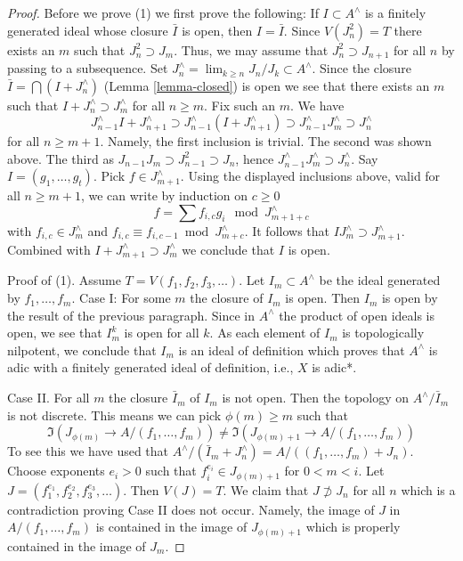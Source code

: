 \begin{proof}
\medskip\noindent
Before we prove (1) we first prove the following: If $I \subset A^\wedge$ is
a finitely generated ideal whose closure $\bar I$ is open, then $I = \bar I$.
Since $V(J_n^2) = T$ there exists an $m$ such that $J_n^2 \supset J_m$.
Thus, we may assume that $J_n^2 \supset J_{n + 1}$ for all $n$ by passing
to a subsequence. Set $J_n^\wedge = \lim_{k \geq n} J_n/J_k \subset A^\wedge$.
Since the closure $\bar I = \bigcap (I + J_n^\wedge)$
(Lemma \ref{lemma-closed}) is open we see that there exists an $m$ such that
$I + J_n^\wedge \supset J_m^\wedge$ for all $n \geq m$. Fix such an $m$.
We have
$$
J_{n - 1}^\wedge I + J_{n + 1}^\wedge \supset
J_{n - 1}^\wedge (I + J_{n + 1}^\wedge) \supset
J_{n - 1}^\wedge J_m^\wedge \supset
J_n^\wedge
$$
for all $n \geq m + 1$. Namely, the first inclusion
is trivial. The second was shown above. The third as
$J_{n - 1}J_m \supset J_{n - 1}^2 \supset J_n$,
hence $J_{n - 1}^\wedge J_m^\wedge \supset J_n^\wedge$.
Say $I = (g_1, \ldots, g_t)$. Pick $f \in J_{m + 1}^\wedge$.
Using the displayed inclusions above, valid for all $n \geq m + 1$,
we can write by induction on $c \geq 0$
$$
f = \sum f_{i, c} g_i \mod J_{m + 1+ c}^\wedge
$$
with $f_{i, c} \in J_m^\wedge$ and
$f_{i, c} \equiv f_{i, c - 1} \bmod J_{m + c}^\wedge$.
It follows that $IJ_m^\wedge \supset J_{m + 1}^\wedge$.
Combined with $I + J_{m + 1}^\wedge \supset J_m^\wedge$
we conclude that $I$ is open.

\medskip\noindent
Proof of (1). Assume $T = V(f_1, f_2, f_3, \ldots)$.
Let $I_m \subset A^\wedge$ be the ideal generated by $f_1, \ldots, f_m$.
Case I: For some $m$ the closure of $I_m$ is open. Then $I_m$ is open by
the result of the previous paragraph. Since in $A^\wedge$ the
product of open ideals is open, we see that $I_m^k$ is open for all $k$.
As each element of $I_m$ is topologically nilpotent, we conclude
that $I_m$ is an ideal of definition which proves that $A^\wedge$
is adic with a finitely generated ideal of definition, i.e.,
$X$ is adic*.

\medskip\noindent
Case II. For all $m$ the closure $\bar I_m$ of $I_m$ is not open.
Then the topology on $A^\wedge/\bar I_m$ is not discrete. This means
we can pick $\phi(m) \geq m$ such that
$$
\Im(J_{\phi(m)} \to A/(f_1, \ldots, f_m)) \not =
\Im(J_{\phi(m) + 1} \to A/(f_1, \ldots, f_m))
$$
To see this we have used that
$A^\wedge/(\bar I_m + J_n^\wedge) = A/((f_1, \ldots, f_m) + J_n)$.
Choose exponents $e_i > 0$ such that $f_i^{e_i} \in J_{\phi(m) + 1}$
for $0 < m < i$. Let $J = (f_1^{e_1}, f_2^{e_2}, f_3^{e_3}, \ldots)$.
Then $V(J) = T$. We claim that $J \not \supset J_n$ for all $n$
which is a contradiction proving Case II does not occur.
Namely, the image of $J$ in $A/(f_1, \ldots, f_m)$ is contained
in the image of $J_{\phi(m) + 1}$ which is properly contained in the
image of $J_m$.
\end{proof}




